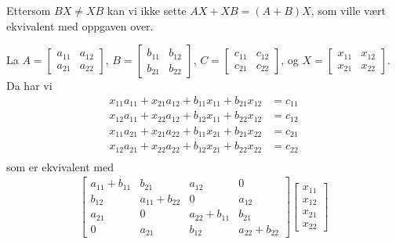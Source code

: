 \documentclass[11pt, a4paper, norsk]{NTNUoving}
\begin{document}
\begin{oppgave}[4]
    \begin{punkt}
        Ettersom $BX \neq XB$ kan vi ikke sette  $AX+XB=(A+B)X$, som ville vært ekvivalent med oppgaven over. 
    \end{punkt}
    
    \begin{punkt}
        La $A=\begin{bmatrix} a_{11} & a_{12}\\ a_{21} & a_{22} \end{bmatrix}$, $B=\begin{bmatrix} b_{11} & b_{12}\\ b_{21} & b_{22} \end{bmatrix}$, $C=\begin{bmatrix} c_{11} & c_{12}\\ c_{21} & c_{22} \end{bmatrix}$, og $X=\begin{bmatrix} x_{11} & x_{12}\\ x_{21} & x_{22} \end{bmatrix}$. Da har vi
        \begin{align*}
            x_{11}a_{11}+x_{21}a_{12}+b_{11}x_{11}+b_{21}x_{12} &= c_{11}\\
            x_{12}a_{11}+x_{22}a_{12}+b_{12}x_{11}+b_{22}x_{12} &= c_{12}\\
            x_{11}a_{21}+x_{21}a_{22}+b_{11}x_{21}+b_{21}x_{22} &= c_{21}\\
            x_{12}a_{21}+x_{22}a_{22}+b_{12}x_{21}+b_{22}x_{22} &= c_{22}\\
        \end{align*}
        som er ekvivalent med
        \begin{align*}
            \begin{bmatrix}
                a_{11}+b_{11} & b_{21} & a_{12} & 0\\
                b_{12} & a_{11}+b_{22} & 0 & a_{12}\\
                a_{21} & 0 & a_{22}+b_{11} & b_{21}\\
                0 & a_{21} & b_{12} & a_{22} + b_{22}
            \end{bmatrix}
            \begin{bmatrix}
                x_{11}\\
                x_{12}\\
                x_{21}\\
                x_{22}

\end{bmatrix}
\end{align*}
\end{punkt}
\end{oppgave}
\end{document}

